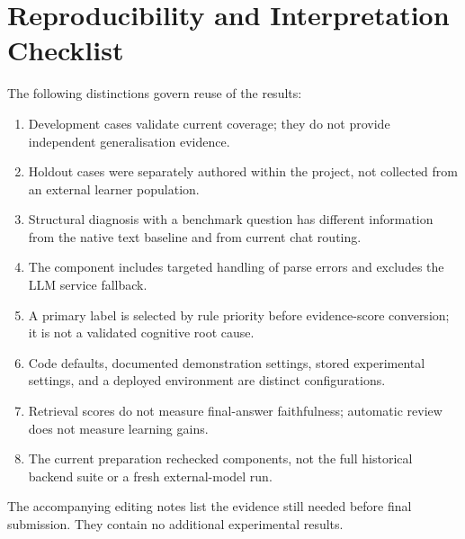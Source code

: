 \chapter{Reproducibility and Interpretation Checklist}
The following distinctions govern reuse of the results:
\begin{enumerate}
\item Development cases validate current coverage; they do not provide independent generalisation evidence.
\item Holdout cases were separately authored within the project, not collected from an external learner population.
\item Structural diagnosis with a benchmark question has different information from the native text baseline and from current chat routing.
\item The  component includes targeted handling of parse errors and excludes the LLM service fallback.
\item A primary label is selected by rule priority before evidence-score conversion; it is not a validated cognitive root cause.
\item Code defaults, documented demonstration settings, stored experimental settings, and a deployed environment are distinct configurations.
\item Retrieval scores do not measure final-answer faithfulness; automatic review does not measure learning gains.
\item The current preparation rechecked components, not the full historical backend suite or a fresh external-model run.
\end{enumerate}
The accompanying editing notes list the evidence still needed before final submission. They contain no additional experimental results.
